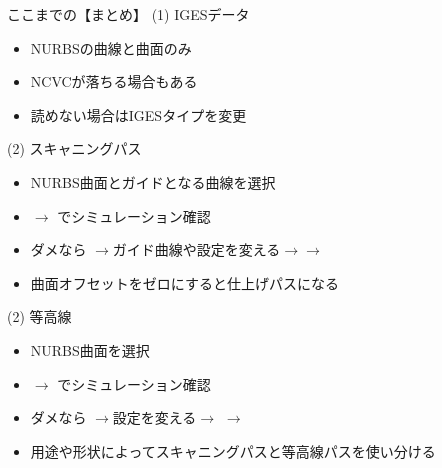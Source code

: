 \newpage
\begin{itembox}[l]{ここまでの【まとめ】}
(1) IGESデータ
\begin{itemize}
\item NURBSの曲線と曲面のみ
\item NCVCが落ちる場合もある
\item 読めない場合はIGESタイプを変更
\end{itemize}
(2) スキャニングパス
\begin{itemize}
\item NURBS曲面とガイドとなる曲線を選択
\item {}$\rightarrow$ でシミュレーション確認
\item ダメなら  $\rightarrow$ガイド曲線や設定を変える$\rightarrow$$\rightarrow$
\item 曲面オフセットをゼロにすると仕上げパスになる
\end{itemize}
(2) 等高線
\begin{itemize}
\item NURBS曲面を選択
\item {}$\rightarrow$ でシミュレーション確認
\item ダメなら  $\rightarrow$設定を変える$\rightarrow$ $\rightarrow$
\item 用途や形状によってスキャニングパスと等高線パスを使い分ける
\end{itemize}
\end{itembox}
